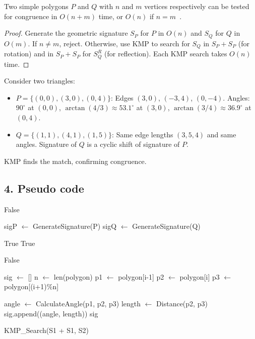 \begin{theorem}
\label{thm:pm_congruence}
Two simple polygons $P$ and $Q$ with $n$ and $m$ vertices respectively can be tested for congruence in $O(n + m)$ time, or $O(n)$ if $n = m$~\cite{arkin1991}.
\end{theorem}
\begin{proof}
Generate the geometric signature $S_P$ for $P$ in $O(n)$ and $S_Q$ for $Q$ in $O(m)$. If $n \ne m$, reject. Otherwise, use KMP to search for $S_Q$ in $S_P + S_P$ (for rotation) and in $S_P + S_P$ for $S_Q^R$ (for reflection). Each KMP search takes $O(n)$ time.
\end{proof}

\begin{example}
\label{ex:pm_congruence}
Consider two triangles:
\begin{itemize}
    \item $P = \{(0,0),(3,0),(0,4)\}$: Edges $(3,0)$, $(-3,4)$, $(0,-4)$.  Angles: $90^\circ$ at $(0,0)$, $\arctan(4/3) \approx 53.1^\circ$ at $(3,0)$, $\arctan(3/4) \approx 36.9^\circ$ at $(0,4)$.
    \item $Q = \{(1,1),(4,1),(1,5)\}$: Same edge lengths $(3, 5, 4)$ and same angles.  Signature of $Q$ is a cyclic shift of signature of $P$.
\end{itemize}
KMP finds the match, confirming congruence.
\end{example}

\subsection{4. Pseudo code}
\begin{algorithm}
\begin{algorithmic}[1]
\label{alg:is_congruent}
        \State \Return False
    \EndIf
    
    \State sigP $\gets$ GenerateSignature(P)
    \State sigQ $\gets$ GenerateSignature(Q)
    
        \State \Return True
    \EndIf
        \State \Return True
    \EndIf
    
    \State \Return False
\EndFunction

\label{alg:gen_signature}
    \State sig $\gets$ []
    \State n $\gets$ len(polygon)
        \State p1 $\gets$ polygon[i-1]
        \State p2 $\gets$ polygon[i]
        \State p3 $\gets$ polygon[(i+1)\%n]
        
        \State angle $\gets$ CalculateAngle(p1, p2, p3)
        \State length $\gets$ Distance(p2, p3)
        \State sig.append((angle, length))
    \EndFor
    \State \Return sig
\EndFunction

\label{alg:is_cyclic_shift}
    \State \Return KMP\_Search(S1 + S1, S2)
\EndFunction
\end{algorithmic}
\end{algorithm}

